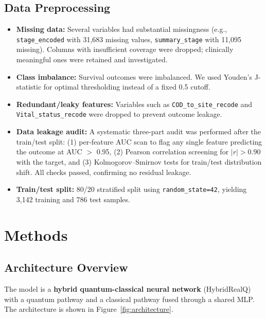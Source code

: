 \documentclass[12pt, letterpaper]{article}
\begin{document}
\subsection{Data Preprocessing}
\begin{itemize}
    \item \textbf{Missing data:} Several variables had substantial missingness (e.g., \texttt{stage\_encoded} with 31{,}683 missing values, \texttt{summary\_stage} with 11{,}095 missing). Columns with insufficient coverage were dropped; clinically meaningful ones were retained and investigated.
    \item \textbf{Class imbalance:} Survival outcomes were imbalanced. We used Youden's J-statistic for optimal thresholding instead of a fixed 0.5 cutoff.
    \item \textbf{Redundant/leaky features:} Variables such as \texttt{COD\_to\_site\_recode} and \texttt{Vital\_status\_recode} were dropped to prevent outcome leakage.
    \item \textbf{Data leakage audit:} A systematic three-part audit was performed after the train/test split: (1) per-feature AUC scan to flag any single feature predicting the outcome at AUC $>$ 0.95, (2) Pearson correlation screening for $|r| > 0.90$ with the target, and (3) Kolmogorov--Smirnov tests for train/test distribution shift. All checks passed, confirming no residual leakage.
    \item \textbf{Train/test split:} 80/20 stratified split using \texttt{random\_state=42}, yielding 3{,}142 training and 786 test samples.
\end{itemize}


\section{Methods}

\subsection{Architecture Overview}
The model is a \textbf{hybrid quantum-classical neural network} (HybridRealQ) with a quantum pathway and a classical pathway fused through a shared MLP. The architecture is shown in Figure~\ref{fig:architecture}.
\end{document}
